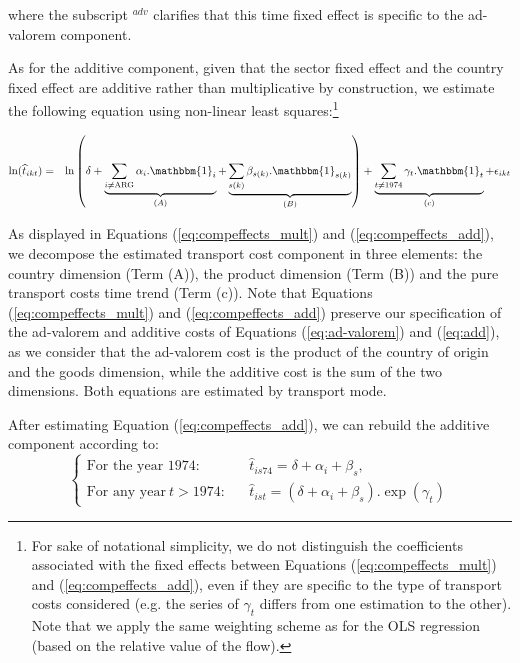 \documentclass[a4paper,11pt]{article}
\begin{document}
\noindent where the subscript $^{adv}$ clarifies that this time fixed effect is specific to the ad-valorem component. \medskip


As for the additive component, given that the sector fixed effect and the country fixed effect are additive rather than multiplicative by construction, we estimate the following equation using non-linear least squares:\footnote{For sake of notational simplicity, we do not distinguish the coefficients associated with the fixed effects between Equations (\ref{eq:compeffects_mult}) and (\ref{eq:compeffects_add}), even if they are specific to the type of transport costs considered (e.g. the series of $\gamma_t$ differs from one estimation to the other).
Note that we apply the same weighting scheme as for the OLS regression (based on the relative value of the flow).}

\begin{eqnarray}
\ln(\widehat{t}_{ikt})&=&\ln\left( \delta + \underbrace{\sum_{i \neq \text{ARG}}  \alpha_i.\mathbbm{1}_i}_{(A)}+\underbrace{\sum_{s(k)}\beta_{s(k)}.\mathbbm{1}_{s(k)}}_{(B)}\right) + \underbrace{\sum_{t \neq 1974}\gamma_t.\mathbbm{1}_t}_{(c)}+\epsilon_{ikt} \label{eq:compeffects_add}
\end{eqnarray}



As displayed in Equations (\ref{eq:compeffects_mult}) and (\ref{eq:compeffects_add}), we decompose the estimated transport cost component in three elements: the country dimension (Term (A)), the product dimension (Term (B)) and the pure transport costs time trend (Term (c)).
Note that Equations (\ref{eq:compeffects_mult}) and (\ref{eq:compeffects_add}) preserve our specification of the ad-valorem and additive costs of Equations (\ref{eq:ad-valorem}) and (\ref{eq:add}), as we consider that the ad-valorem cost is the product of the country of origin and the goods dimension, while the additive cost is the sum of the two dimensions.
Both equations are estimated by transport mode.\smallskip

After estimating Equation (\ref{eq:compeffects_add}), we can rebuild the additive component according to:
\[\left\{
  \begin{array}{lcl}
\text{For the year 1974:}&&\widehat{t}_{is74}=  \delta + \alpha_i+ \beta_s, \\
\text{For any year}~t> 1974:&&\widehat{t}_{ist}=\left(\delta + \alpha_i+ \beta_s\right).\exp(\gamma_t)
\end{array}
\right.\]
\end{document}
